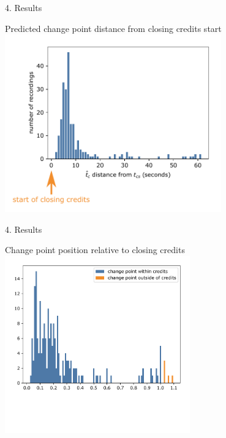 \documentclass[first=orange,second=blue,logo=blueque]{aaltoslides}
\begin{document}
\begin{frame}{4. Results}
    \begin{block}{{\color{black}Predicted change point distance from closing credits start}}
        \includegraphics[width=0.7\textwidth]{figures/result_absolute1.pdf}
    \end{block}
\end{frame}


\begin{frame}{4. Results}
    \begin{block}{{\color{black}Change point position relative to closing credits}}
        \includegraphics[width=0.6\textwidth]{figures/result_relative0.pdf}
    \end{block}
\end{frame}

\end{document}
